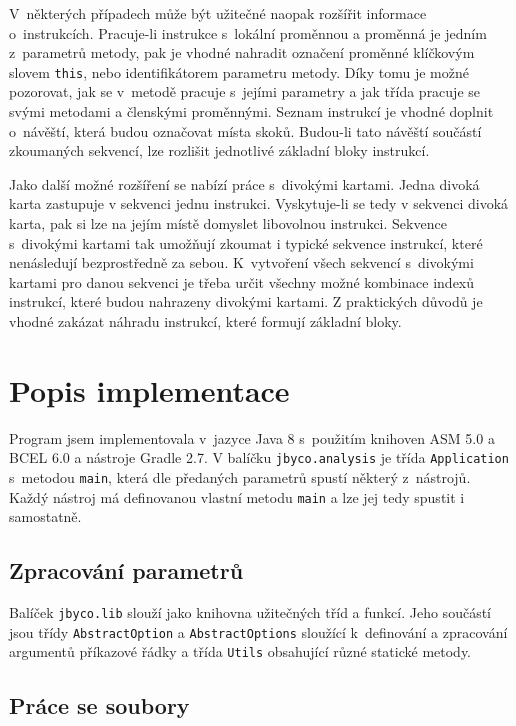 V~některých případech může být užitečné naopak rozšířit informace o~instrukcích. Pracuje-li instrukce s~lokální proměnnou a proměnná je jedním z~parametrů metody, pak je vhodné nahradit označení proměnné klíčkovým slovem \texttt{this}, nebo identifikátorem parametru metody. Díky tomu je možné pozorovat, jak se v~metodě pracuje s~jejími parametry a jak třída pracuje se svými metodami a členskými proměnnými.
Seznam instrukcí je vhodné doplnit o~návěští, která budou označovat místa skoků. Budou-li tato návěští součástí zkoumaných sekvencí, lze rozlišit jednotlivé základní bloky instrukcí.

Jako další možné rozšíření se nabízí práce s~divokými kartami.
Jedna divoká karta zastupuje v sekvenci jednu instrukci. Vyskytuje-li se tedy v sekvenci divoká karta, pak si lze na jejím místě domyslet libovolnou instrukci. Sekvence s~divokými kartami tak umožňují zkoumat i typické sekvence instrukcí, které nenásledují bezprostředně za sebou. K~vytvoření všech sekvencí s~divokými kartami pro danou sekvenci je třeba určit všechny možné kombinace indexů instrukcí, které budou nahrazeny divokými kartami. Z praktických důvodů je vhodné zakázat náhradu instrukcí, které formují základní bloky.

\section{Popis implementace}\label{ToolImplementation}

Program jsem implementovala v~jazyce Java 8 s~použitím knihoven ASM 5.0 a BCEL 6.0 a nástroje Gradle 2.7. V balíčku \texttt{jbyco.analysis} je třída \texttt{Application} s~metodou \texttt{main}, která dle předaných parametrů spustí některý z~nástrojů. Každý nástroj má definovanou vlastní metodu \texttt{main} a lze jej tedy spustit i samostatně.

\subsection{Zpracování parametrů}

Balíček \texttt{jbyco.lib} slouží jako knihovna užitečných tříd a funkcí. Jeho součástí jsou třídy \texttt{AbstractOption} a \texttt{AbstractOptions} sloužící k~definování a zpracování argumentů příkazové řádky a třída \texttt{Utils} obsahující různé statické metody. 

\subsection{Práce se soubory}

